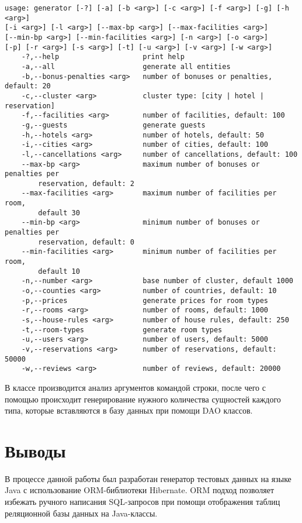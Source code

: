 \begin{lstlisting}[language=none]
usage: generator [-?] [-a] [-b <arg>] [-c <arg>] [-f <arg>] [-g] [-h <arg>] 
[-i <arg>] [-l <arg>] [--max-bp <arg>] [--max-facilities <arg>] 
[--min-bp <arg>] [--min-facilities <arg>] [-n <arg>] [-o <arg>] 
[-p] [-r <arg>] [-s <arg>] [-t] [-u <arg>] [-v <arg>] [-w <arg>]
	-?,--help                    print help
	-a,--all                     generate all entities
	-b,--bonus-penalties <arg>   number of bonuses or penalties, default: 20
	-c,--cluster <arg>           cluster type: [city | hotel | reservation]
	-f,--facilities <arg>        number of facilities, default: 100
	-g,--guests                  generate guests
	-h,--hotels <arg>            number of hotels, default: 50
	-i,--cities <arg>            number of cities, default: 100
	-l,--cancellations <arg>     number of cancellations, default: 100
	--max-bp <arg>               maximum number of bonuses or penalties per
		reservation, default: 2
	--max-facilities <arg>       maximum number of facilities per room,
		default 30
	--min-bp <arg>               minimum number of bonuses or penalties per
		reservation, default: 0
	--min-facilities <arg>       minimum number of facilities per room,
		default 10
	-n,--number <arg>            base number of cluster, default 1000
	-o,--counties <arg>          number of countries, default: 10
	-p,--prices                  generate prices for room types
	-r,--rooms <arg>             number of rooms, default: 1000
	-s,--house-rules <arg>       number of house rules, default: 250
	-t,--room-types              generate room types
	-u,--users <arg>             number of users, default: 5000
	-v,--reservations <arg>      number of reservations, default: 50000
	-w,--reviews <arg>           number of reviews, default: 20000
\end{lstlisting}

В классе  производится анализ аргументов командой строки, после чего с помощью  происходит генерирование нужного количества сущностей каждого типа, которые вставляются в базу данных при помощи DAO классов.

\section{Выводы}

В процессе данной работы был разработан генератор тестовых данных на языке Java с использование ORM-библиотеки Hibernate. ORM подход позволяет избежать ручного написания SQL-запросов при помощи отображения таблиц реляционной базы данных на Java-классы.


